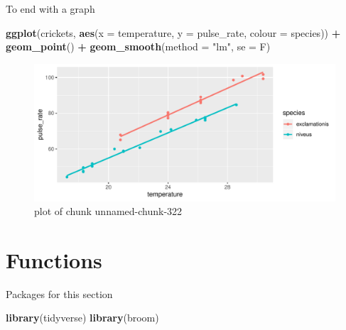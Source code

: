 \documentclass[
  ignorenonframetext,
]{beamer}
\newenvironment{Shaded}{\begin{snugshade}}{\end{snugshade}}
\newcommand{\DataTypeTok}[1]{\textcolor[rgb]{0.13,0.29,0.53}{#1}}
\newcommand{\KeywordTok}[1]{\textcolor[rgb]{0.13,0.29,0.53}{\textbf{#1}}}
\newcommand{\NormalTok}[1]{#1}
\newcommand{\OperatorTok}[1]{\textcolor[rgb]{0.81,0.36,0.00}{\textbf{#1}}}
\newcommand{\StringTok}[1]{\textcolor[rgb]{0.31,0.60,0.02}{#1}}
\begin{document}
\begin{frame}[fragile]{To end with a graph}
\protect\hypertarget{to-end-with-a-graph}{}

\begin{Shaded}
\begin{Highlighting}[]
\KeywordTok{ggplot}\NormalTok{(crickets, }\KeywordTok{aes}\NormalTok{(}\DataTypeTok{x =}\NormalTok{ temperature, }\DataTypeTok{y =}\NormalTok{ pulse_rate,}
  \DataTypeTok{colour =}\NormalTok{ species)) }\OperatorTok{+}
\StringTok{  }\KeywordTok{geom_point}\NormalTok{() }\OperatorTok{+}\StringTok{ }\KeywordTok{geom_smooth}\NormalTok{(}\DataTypeTok{method =} \StringTok{"lm"}\NormalTok{, }\DataTypeTok{se =}\NormalTok{ F)}
\end{Highlighting}
\end{Shaded}

\begin{figure}
\centering
\includegraphics{figure/unnamed-chunk-322-1.pdf}
\caption{plot of chunk unnamed-chunk-322}
\end{figure}

\end{frame}

\hypertarget{functions}{%
\section{Functions}\label{functions}}

\begin{frame}[fragile]{Packages for this section}
\protect\hypertarget{packages-for-this-section-8}{}

\begin{Shaded}
\begin{Highlighting}[]
\KeywordTok{library}\NormalTok{(tidyverse)}
\KeywordTok{library}\NormalTok{(broom)}
\end{Highlighting}
\end{Shaded}

\end{frame}
\end{document}
